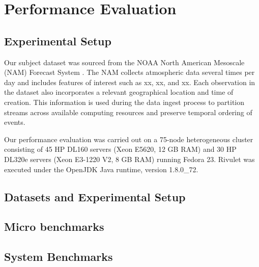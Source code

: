 \section{Performance Evaluation}
\label{sec:performance}

\subsection{Experimental Setup}
Our subject dataset was sourced from the NOAA North American Mesoscale (NAM) Forecast System \cite{noaa_nam}.  The NAM collects atmospheric data several times per day and includes features of interest such as xx, xx, and xx. Each observation in the dataset also incorporates a relevant geographical location and time of creation. This information is used during the data ingest process to partition streams across available computing resources and preserve temporal ordering of events.

Our performance evaluation was carried out on a 75-node heterogeneous cluster consisting of 45 HP DL160 servers (Xeon E5620, 12 GB RAM) and 30 HP DL320e servers (Xeon E3-1220 V2, 8 GB RAM) running Fedora 23. Rivulet was executed under the OpenJDK Java runtime, version 1.8.0\_72.


\subsection{Datasets and Experimental Setup}

\subsection{Micro benchmarks}

\subsection{System Benchmarks}

